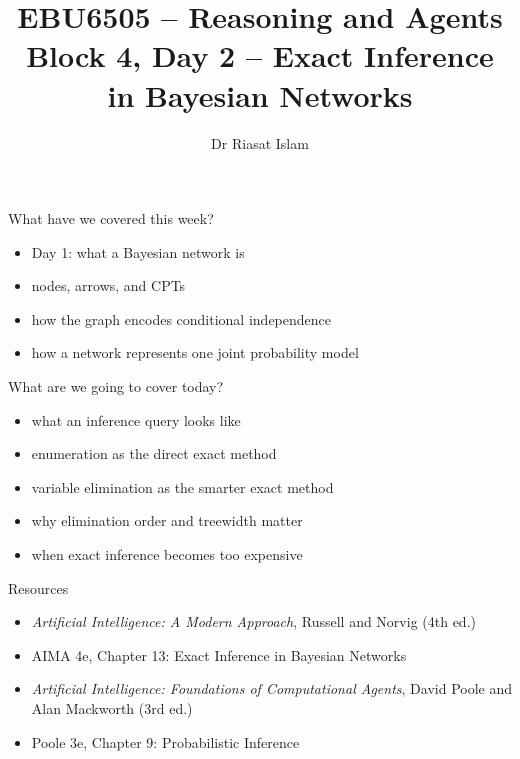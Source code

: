 \documentclass[aspectratio=169]{beamer}
\title[EBU6505 B4 D2]{EBU6505 -- Reasoning and Agents\\Block 4, Day 2 -- Exact Inference in Bayesian Networks}
\author{Dr Riasat Islam}
\institute{Queen Mary University of London}
\date{}
\newcommand{\defaultdeckrefs}{AIMA4e Ch.13 pp.412--460; Poole3e Ch.9 pp.375--458}
\newcommand{\currentsliderefs}{\defaultdeckrefs}
\newcommand{\setslideref}[1]{\gdef\currentsliderefs{#1}}
\begin{document}
\setslideref{AIMA4e Ch.13 pp.412--460; Poole3e Ch.9 pp.375--458}
\begin{frame}
  \titlepage
\end{frame}

\begin{frame}{What have we covered this week?}
\begin{itemize}
  \item Day 1: what a Bayesian network is
  \item nodes, arrows, and CPTs
  \item how the graph encodes conditional independence
  \item how a network represents one joint probability model
\end{itemize}
\end{frame}

\begin{frame}{What are we going to cover today?}
\begin{itemize}
  \item what an inference query looks like
  \item enumeration as the direct exact method
  \item variable elimination as the smarter exact method
  \item why elimination order and treewidth matter
  \item when exact inference becomes too expensive
\end{itemize}
\end{frame}

\begin{frame}{Resources}
\small
\begin{itemize}
  \item \textit{Artificial Intelligence: A Modern Approach}, Russell and Norvig (4th ed.)
  \item AIMA 4e, Chapter 13: Exact Inference in Bayesian Networks
  \item \textit{Artificial Intelligence: Foundations of Computational Agents}, David Poole and Alan Mackworth (3rd ed.)
  \item Poole 3e, Chapter 9: Probabilistic Inference
\end{itemize}
\end{frame}
\end{document}
